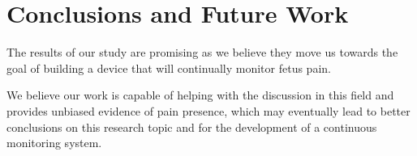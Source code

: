 \chapter{Conclusions and Future Work}

The results of our study are promising as we believe they move us towards the goal of building a device that will continually monitor fetus pain.

We believe our work is capable of helping with the discussion in this field and provides unbiased evidence of pain presence, which may eventually lead to better conclusions on this research topic and for the development of a continuous monitoring system.